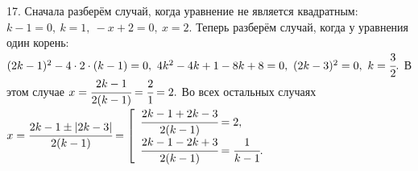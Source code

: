 17. Сначала разберём случай, когда уравнение не является квадратным: $k-1=0,\ k=1,\ -x+2=0,\ x=2.$ Теперь разберём случай, когда у уравнения один корень:
$(2k-1)^2-4\cdot2\cdot(k-1)=0,\ 4k^2-4k+1-8k+8=0,\ (2k-3)^2=0,\ k=\cfrac{3}{2}.$ В этом случае $x=\cfrac{2k-1}{2(k-1)}=\cfrac{2}{1}=2.$ Во всех остальных случаях $x=\cfrac{2k-1\pm|2k-3|}{2(k-1)}=\left[\begin{array}{l}\cfrac{2k-1+2k-3}{2(k-1)}=2,\\ \cfrac{2k-1-2k+3}{2(k-1)}=\cfrac{1}{k-1}.\end{array}\right.$\\
